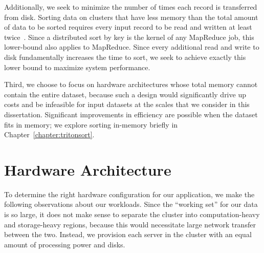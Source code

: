 Additionally, we seek to minimize the number of times each record is
transferred from disk.  Sorting data on clusters that have less memory than the
total amount of data to be sorted requires every input record to be read and
written at least twice~\cite{sort-io}.  Since a distributed sort by key is the
kernel of any MapReduce job, this lower-bound also applies to MapReduce. Since
every additional read and write to disk fundamentally increases the time to
sort, we seek to achieve exactly this lower bound to maximize system
performance.

Third, we choose to focus on hardware architectures whose total memory cannot
contain the entire dataset, because such a design would significantly drive up
costs and be infeasible for input datasets at the scales that we consider in
this dissertation. Significant improvements in efficiency are possible when
the dataset fits in memory; we explore sorting in-memory briefly in
Chapter~\ref{chapter:tritonsort}.

\section{Hardware Architecture}
\label{sec:hardware_architecture}

To determine the right hardware configuration for our application, we make the
following observations about our workloads. Since the ``working set'' for our
data is so large, it does not make sense to separate the cluster into
computation-heavy and storage-heavy regions, because this would necessitate
large network transfer between the two. Instead, we provision each server
in the cluster with an equal amount of processing power and disks.

